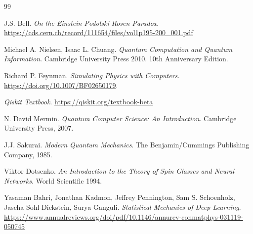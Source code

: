 \documentclass[a4paper]{article}
\begin{document}
\begin{thebibliography}{99}

 J.S. Bell. \textit{On the Einstein Podolski Rosen Paradox}. \url{https://cds.cern.ch/record/111654/files/vol1p195-200_001.pdf}

 Michael A. Nielsen, Isaac L. Chuang. \textit{Quantum Computation and Quantum Information}. Cambridge University Press 2010. 10th Anniversary Edition.

 Richard P. Feynman. \textit{Simulating Physics with Computers.} \url{https://doi.org/10.1007/BF02650179}.

 \textit{Qiskit Textbook}. \url{https://qiskit.org/textbook-beta}

 N. David Mermin. \textit{Quantum Computer Science: An Introduction}. Cambridge University Press, 2007.

 J.J. Sakurai. \textit{Modern Quantum Mechanics}. The Benjamin/Cummings Publishing Company, 1985.

 Viktor Dotsenko. \textit{An Introduction to the Theory of Spin Glasses and Neural Networks}. World Scientific 1994.

 Yasaman Bahri, Jonathan Kadmon, Jeffrey Pennington, Sam S. Schoenholz, Jascha Sohl-Dickstein, Surya Ganguli. \textit{Statistical Mechanics of Deep Learning}. \url{https://www.annualreviews.org/doi/pdf/10.1146/annurev-conmatphys-031119-050745}



\end{thebibliography}
\end{document}
